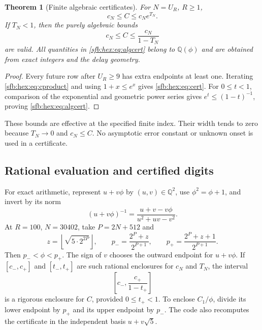 \documentclass[11pt]{article}
\newtheorem{theorem}{Theorem}[section]
\theoremstyle{remark}\newtheorem{remark}[theorem]{Remark}
\newcommand{\Q}{\mathbb Q}
\begin{document}
\begin{theorem}[Finite algebraic certificates]\label{sfb:hex:thm:cert}
For $N=U_R$, $R\ge1$,
\begin{equation}\label{sfb:hex:eq:cert}
 c_N\le C\le c_N e^{T_N}.
\end{equation}
If $T_N<1$, then the purely algebraic bounds
\begin{equation}\label{sfb:hex:eq:algcert}
 c_N\le C\le\frac{c_N}{1-T_N}
\end{equation}
are valid. All quantities in \eqref{sfb:hex:eq:algcert} belong to $\Q(\phi)$ and are obtained from exact integers and the delay geometry.
\end{theorem}
\begin{proof}
Every future row after $U_R\ge9$ has extra endpoints at least one. Iterating \eqref{sfb:hex:eq:cproduct} and using $1+x\le e^x$ gives \eqref{sfb:hex:eq:cert}. For $0\le t<1$, comparison of the exponential and geometric power series gives $e^t\le(1-t)^{-1}$, proving \eqref{sfb:hex:eq:algcert}.
\end{proof}

These bounds are effective at the specified finite index. Their width tends to zero because $T_N\to0$ and $c_N\le C$. No asymptotic error constant or unknown onset is used in a certificate.

\subsection{Rational evaluation and certified digits}
For exact arithmetic, represent $u+v\phi$ by $(u,v)\in\Q^2$, use $\phi^2=\phi+1$, and invert by its norm
\[
 (u+v\phi)^{-1}=\frac{u+v-v\phi}{u^2+uv-v^2}.
\]
At $R=100$, $N=30402$, take $P=2N+512$ and
\begin{equation}\label{sfb:hex:eq:phibracket}
 z=\left\lfloor\sqrt{5\cdot2^{2P}}\right\rfloor,\qquad
 p_-=\frac{2^P+z}{2^{P+1}},\qquad
 p_+=\frac{2^P+z+1}{2^{P+1}}.
\end{equation}
Then $p_-<\phi<p_+$. The sign of $v$ chooses the outward endpoint for $u+v\phi$. If $[c_-,c_+]$ and $[t_-,t_+]$ are such rational enclosures for $c_N$ and $T_N$, the interval
\begin{equation}\label{sfb:hex:eq:rationalcert}
 \left[c_-,\frac{c_+}{1-t_+}\right]
\end{equation}
is a rigorous enclosure for $C$, provided $0\le t_+<1$. To enclose $C_1/\phi$, divide its lower endpoint by $p_+$ and its upper endpoint by $p_-$. The code also recomputes the certificate in the independent basis $u+v\sqrt5$.
\end{document}
